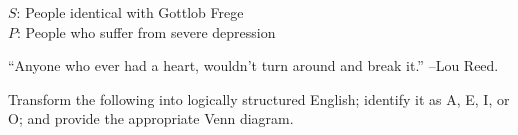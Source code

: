 \begin{exercises}
{$S$: People identical with Gottlob Frege\\
$P$: People who suffer from severe depression\\
}

\item ``Anyone who ever had a heart, wouldn't turn around and break it.'' --Lou Reed. 

\end{exercises}

\noindent\problempart Transform the following into logically structured English; identify it as A, E, I, or O; and provide the appropriate Venn diagram.

